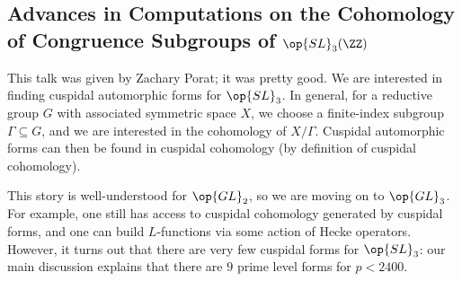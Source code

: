 \documentclass{article}
\begin{document}
\subsection{Advances in Computations on the Cohomology of Congruence Subgroups of \texorpdfstring{$\op{SL}_3(\ZZ)$}{SL3(Z)}}
This talk was given by Zachary Porat; it was pretty good. We are interested in finding cuspidal automorphic forms for $\op{SL}_3$. In general, for a reductive group $G$ with associated symmetric space $X$, we choose a finite-index subgroup $\Gamma\subseteq G$, and we are interested in the cohomology of $X/\Gamma$. Cuspidal automorphic forms can then be found in cuspidal cohomology (by definition of cuspidal cohomology).

This story is well-understood for $\op{GL}_2$, so we are moving on to $\op{GL}_3$. For example, one still has access to cuspidal cohomology generated by cuspidal forms, and one can build $L$-functions via some action of Hecke operators. However, it turns out that there are very few cuspidal forms for $\op{SL}_3$: our main discussion explains that there are $9$ prime level forms for $p<2400$.
\end{document}

